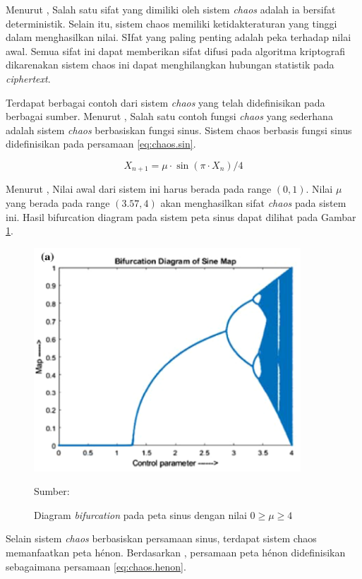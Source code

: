 Menurut \textcite{munir2019}, Salah satu sifat yang dimiliki oleh sistem \emph{chaos} adalah ia bersifat deterministik. Selain itu, sistem chaos memiliki ketidakteraturan yang tinggi dalam menghasilkan nilai. SIfat yang paling penting adalah peka terhadap nilai awal. Semua sifat ini dapat memberikan sifat difusi pada algoritma kriptografi dikarenakan sistem chaos ini dapat menghilangkan hubungan statistik pada \emph{ciphertext}.

Terdapat berbagai contoh dari sistem \emph{chaos} yang telah didefinisikan pada berbagai sumber. Menurut \textcite{patel2021}, Salah satu contoh fungsi \emph{chaos} yang sederhana adalah sistem \emph{chaos} berbasiskan fungsi sinus. Sistem chaos berbasis fungsi sinus didefinisikan pada persamaan \ref{eq:chaos.sin}.

\begin{equation}
  \label{eq:chaos.sin}
  X_{n+1} = \mu \cdot \sin(\pi \cdot X_n) / 4
\end{equation}

Menurut \textcite{patel2021}, Nilai awal dari sistem ini harus berada pada range $(0, 1)$. Nilai $\mu$ yang berada pada range $(3.57, 4)$ akan menghasilkan sifat \emph{chaos} pada sistem ini. Hasil bifurcation diagram pada sistem peta sinus dapat dilihat pada Gambar \ref{fig:chaos.sin.bifurcation}.

\begin{figure}[!h]
  \centering
  \includegraphics[width=10cm]{chapters/res/chapter-2/img/sine.bifurcation.png}
  \caption{Diagram \emph{bifurcation} pada peta sinus dengan nilai $0 \ge \mu \ge 4$} \label{fig:chaos.sin.bifurcation}
  Sumber: \textcite{patel2021}
\end{figure}


Selain sistem \emph{chaos} berbasiskan persamaan sinus, terdapat sistem chaos memanfaatkan peta hénon. Berdasarkan \textcite{henon1976}, persamaan peta hénon didefinisikan sebagaimana persamaan \ref{eq:chaos.henon}.


